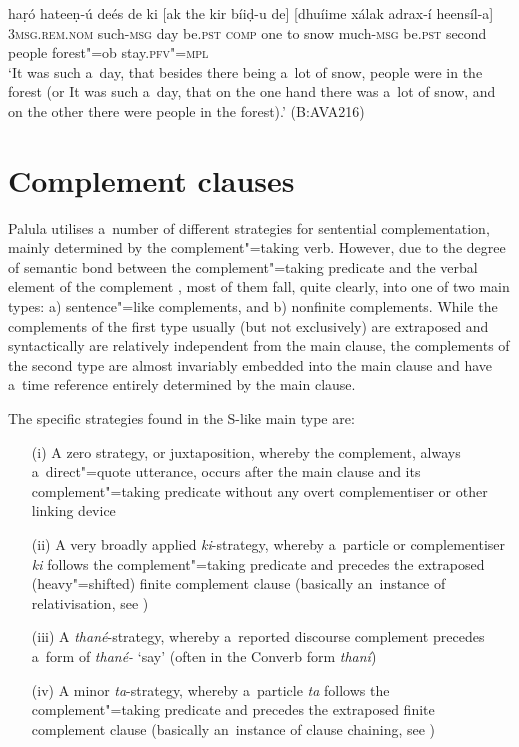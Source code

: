 \begin{exe}
\ex
\label{ex:13-126}
\gll haṛó hateeṇ-ú deés de ki [ak  the kir bíiḍ-u de] [dhuíime xálak  adrax-í heensíl-a] \\
\textsc{3msg.rem.nom} such-\textsc{msg}  day be.\textsc{pst} \textsc{comp} one  to snow much-\textsc{msg} be.\textsc{pst} second people  forest"=ob stay.\textsc{pfv"=mpl} \\
\glt `It was such a~day, that besides there being a~lot of snow, people were in the forest (or It was such a~day, that on the one hand there was a~lot of snow, and on the other there were people in the forest).' (B:AVA216)
\end{exe}

\section{Complement clauses}
\label{sec:13-5}

Palula utilises a~number of different strategies for sentential complementation, mainly determined by the complement"=taking verb. However, due to the degree of semantic bond between the complement"=taking predicate and the verbal element of the complement \citep[39-40]{givon2001b}, most of them fall, quite clearly, into one of two main types: a) sentence"=like complements, and b) nonfinite complements. While the complements of the first type usually (but not exclusively) are extraposed and syntactically are relatively independent from the main clause, the complements of the second type are almost invariably embedded into the main clause and have a~time reference entirely determined by the main clause.

The specific strategies found in the S-like main type are:

\begin{enumerate}
\item[(i)] A zero strategy, or juxtaposition, whereby the complement, always a~direct"=quote utterance, occurs after the main clause and its complement"=taking predicate without any overt complementiser or other linking device
\item[(ii)] A very broadly applied \textit{ki}-strategy, whereby a~particle or complementiser \textit{ki} follows the complement"=taking predicate and precedes the extraposed (heavy"=shifted) finite complement clause (basically an~instance of relativisation, see )
\item[(iii)] A \textit{thané}-strategy, whereby a~reported discourse complement precedes a~form of \textit{thané-} `say' (often in the Converb form \textit{thaní})
\item[(iv)] A minor \textit{ta}-strategy, whereby a~particle \textit{ta} follows the complement"=taking predicate and precedes the extraposed finite complement clause (basically an~instance of clause chaining, see )
\end{enumerate}

